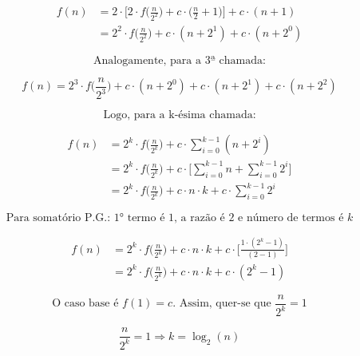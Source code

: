 \documentclass[fontsize=10pt]{article}
\begin{document}
\begin{equation} \label{eq9}
\begin{split}
f(n) & = 2 \cdot \Bigg[ 2 \cdot f \Big( \frac{n}{2^2} \Big) + c \cdot \Big( \frac{n}{2} + 1 \Big) \Bigg] + c \cdot (n + 1) \\
	 & = 2^2 \cdot f \Big( \frac{n}{2^2} \Big) + c \cdot (n + 2^1) + c \cdot (n + 2^0)
\end{split}
\end{equation}

$$ \text{Analogamente, para a 3ª chamada:}$$

\begin{equation} \label{eq10}
f(n) = 2^3 \cdot f \Big( \frac{n}{2^3} \Big) + c \cdot (n + 2^0) + c \cdot (n + 2^1) + c \cdot (n + 2^2)
\end{equation}

$$ \text{Logo, para a k-ésima chamada:}$$

\begin{equation} \label{eq11}
\begin{split}
f(n) & = 2^k \cdot f \Big( \frac{n}{2^k} \Big) + c \cdot \sum_{i = 0}^{k - 1} (n + 2^i) \\
	 & = 2^k \cdot f \Big( \frac{n}{2^k} \Big) + c \cdot \Bigg[ \sum_{i = 0}^{k - 1} n + \sum_{i = 0}^{k - 1} 2^i \Bigg] \\
	 & = 2^k \cdot f \Big( \frac{n}{2^k} \Big) + c \cdot n \cdot k + c \cdot \sum_{i = 0}^{k - 1} 2^i
\end{split}
\end{equation}

$$ \text{Para somatório P.G.: 1° termo é $1$, a razão é $2$ e número de termos é $k$}$$

\begin{equation} \label{eq12}
\begin{split}
f(n) & = 2^k \cdot f \Big( \frac{n}{2^k} \Big) + c  \cdot n \cdot k + c \cdot \Bigg[ \frac{1 \cdot (2^k - 1)}{(2 - 1)} \Bigg] \\
	 & = 2^k \cdot f \Big( \frac{n}{2^k} \Big) + c  \cdot n \cdot k + c \cdot (2^k - 1)
\end{split}
\end{equation}

$$ \text{O caso base é $f(1) = c$. Assim, quer-se que $\frac{n}{2^k} = 1$}$$

\begin{equation} \label{eq14}
\frac{n}{2^k} = 1 \Rightarrow k = \log_2(n)
\end{equation}
\end{document}
